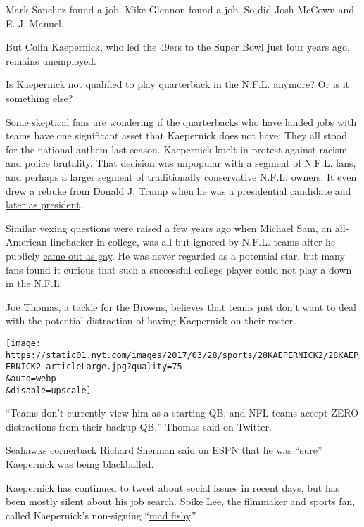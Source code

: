 Mark Sanchez found a job. Mike Glennon found a job. So did Josh McCown
and E. J. Manuel.

But Colin Kaepernick, who led the 49ers to the Super Bowl just four
years ago, remains unemployed.

Is Kaepernick not qualified to play quarterback in the N.F.L. anymore?
Or is it something else?

Some skeptical fans are wondering if the quarterbacks who have landed
jobs with teams have one significant asset that Kaepernick does not
have: They all stood for the national anthem last season. Kaepernick
knelt in protest against racism and police brutality. That decision was
unpopular with a segment of N.F.L. fans, and perhaps a larger segment of
traditionally conservative N.F.L. owners. It even drew a rebuke from
Donald J. Trump when he was a presidential candidate and
\href{https://www.nytimes.com/aponline/2017/03/20/us/politics/ap-us-trump-the-latest.html}{later
as president}.

Similar vexing questions were raised a few years ago when Michael Sam,
an all-American linebacker in college, was all but ignored by N.F.L.
teams after he publicly
\href{https://www.nytimes.com/2014/02/10/sports/michael-sam-college-football-star-says-he-is-gay-ahead-of-nfl-draft.html}{came
out as gay}. He was never regarded as a potential star, but many fans
found it curious that such a successful college player could not play a
down in the N.F.L.

Joe Thomas, a tackle for the Browns, believes that teams just don't want
to deal with the potential distraction of having Kaepernick on their
roster.

\texttt{[image: https://static01.nyt.com/images/2017/03/28/sports/28KAEPERNICK2/28KAEPERNICK2-articleLarge.jpg?quality=75\\\&auto=webp\\\&disable=upscale]}

``Teams don't currently view him as a starting QB, and NFL teams accept
ZERO distractions from their backup QB,'' Thomas said on Twitter.

Seahawks cornerback Richard Sherman
\href{http://www.mediaite.com/online/richard-sherman-im-sure-colin-kaepernick-is-being-blackballed-by-the-nfl/}{said
on ESPN} that he was ``sure'' Kaepernick was being blackballed.

Kaepernick has continued to tweet about social issues in recent days,
but has been mostly silent about his job search. Spike Lee, the
filmmaker and sports fan, called Kaepernick's non-signing
``\href{http://www.bet.com/news/sports/2017/03/20/spike-lee-talks-about-colin-kaepernick.html}{mad
fishy}.''

